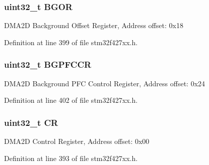 \subsubsection[{\texorpdfstring{B\+G\+OR}{BGOR}}]{ uint32\+\_\+t B\+G\+OR}\hypertarget{struct_d_m_a2_d___type_def_a29e2e00c79be42d49f6f189c207cc664}{}\label{struct_d_m_a2_d___type_def_a29e2e00c79be42d49f6f189c207cc664}
D\+M\+A2D Background Offset Register, Address offset\+: 0x18 

Definition at line 399 of file stm32f427xx.\+h.

\subsubsection[{\texorpdfstring{B\+G\+P\+F\+C\+CR}{BGPFCCR}}]{ uint32\+\_\+t B\+G\+P\+F\+C\+CR}\hypertarget{struct_d_m_a2_d___type_def_a2ad24a3135aa498ba6691f6a114a9826}{}\label{struct_d_m_a2_d___type_def_a2ad24a3135aa498ba6691f6a114a9826}
D\+M\+A2D Background P\+FC Control Register, Address offset\+: 0x24 

Definition at line 402 of file stm32f427xx.\+h.

\subsubsection[{\texorpdfstring{CR}{CR}}]{ uint32\+\_\+t CR}\hypertarget{struct_d_m_a2_d___type_def_ab40c89c59391aaa9d9a8ec011dd0907a}{}\label{struct_d_m_a2_d___type_def_ab40c89c59391aaa9d9a8ec011dd0907a}
D\+M\+A2D Control Register, Address offset\+: 0x00 

Definition at line 393 of file stm32f427xx.\+h.

